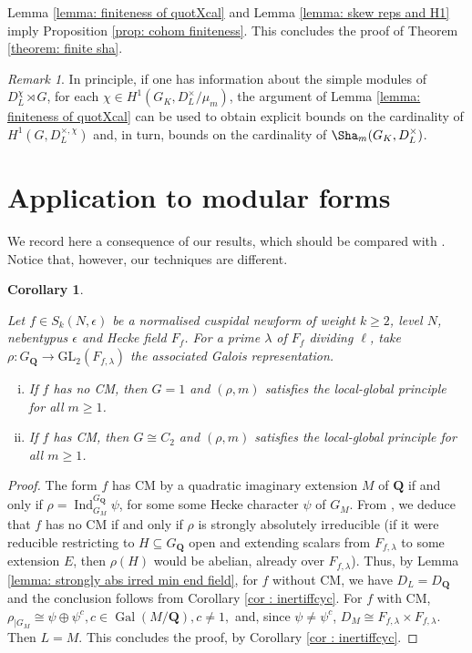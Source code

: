 \documentclass[a4paper,10pt]{amsart}
\theoremstyle{plain}
\newtheorem{corollary}[theorem]{Corollary}
\theoremstyle{definition}
\theoremstyle{remark}
\newtheorem{remark}[theorem]{Remark}
\def\Q{\mathbf Q}
\def\GL{\mathrm{GL}}
\newcommand{\bD}{D_L}
\DeclareMathOperator{\Gal}{Gal}
\DeclareMathOperator{\Ind}{Ind}
\begin{document}
Lemma \ref{lemma: finiteness of quotXcal} and Lemma \ref{lemma: skew reps and H1} imply Proposition \ref{prop: cohom finiteness}. This concludes the proof of Theorem \ref{theorem: finite sha}.
\begin{remark}
In principle, if one has information about the simple modules of \(\bD^\chi \rtimes G\), for each \(\chi \in H^1(G_K, \bD^\times/\mu_m)\), the argument of Lemma \ref{lemma: finiteness of quotXcal} can be used to obtain explicit bounds on the cardinality of \(H^1(G, \bD^{\times, \chi})\) and, in turn, bounds on the cardinality of \(\Sha_m(G_K, \bD^\times)\). 
\end{remark}

\section{Application to modular forms}

We record here a consequence of our results, which should be compared with  
\cite[Theorem 1.1]{recraj}. Notice that, however, our techniques are different.

\begin{corollary}\label{corollary: lgp for mod forms}

Let \(f \in S_{k}(N, \epsilon)\) be a  normalised cuspidal newform of weight \(k \ge 2\), level \(N\), nebentypus \(\epsilon\) and Hecke field \(F_{f}\). For a prime \(\lambda\) of \(F_{f}\) dividing \(\ell\), take \(\rho \colon G_\Q \to \GL_2(F_{f, \lambda})\) the associated Galois representation.
\begin{enumerate}[(i)]
    \item If \(f\) has no CM, then \(G = 1\) and \((\rho, m)\) satisfies the local-global principle for all \(m \ge 1\).
    \item If \(f\) has CM, then \(G \cong C_2\) and \((\rho, m)\) satisfies the local-global principle for all \(m \ge 1\).
\end{enumerate}
\end{corollary}
\begin{proof}
The form \(f\) has CM by a quadratic imaginary extension \(M\) of \(\Q\) if and only if \(\rho = \Ind_{G_M}^{G_\Q} \psi\), for some some Hecke character \(\psi\) of \(G_M\). From \cite[Proposition~4.2, Proposition~4.4]{ribetgalrepseigen}, we deduce that \(f\) has no CM if and only if \(\rho\) is strongly absolutely irreducible (if it were reducible restricting to \(H \subseteq G_\Q\) open and extending scalars from \(F_{f, \lambda}\) to some extension \(E\), then \(\rho(H)\) would be abelian, already over \(F_{f, \lambda}\)).
Thus, by Lemma \ref{lemma: strongly abs irred min end field}, for \(f\) without CM, we have \(D_L = D_\Q\) and the conclusion follows from Corollary \ref{cor : inertiffcyc}.  
For \(f\) with CM, \(\rho_{|G_M} \cong \psi \oplus \psi^c, c \in \Gal(M/\Q), c \neq 1,\) and, since \(\psi\neq \psi^c\), \(D_M \cong F_{f, \lambda} \times F_{f, \lambda}\). Then \(L = M\). This concludes the proof, by Corollary \ref{cor : inertiffcyc}.
\end{proof}
\end{document}
